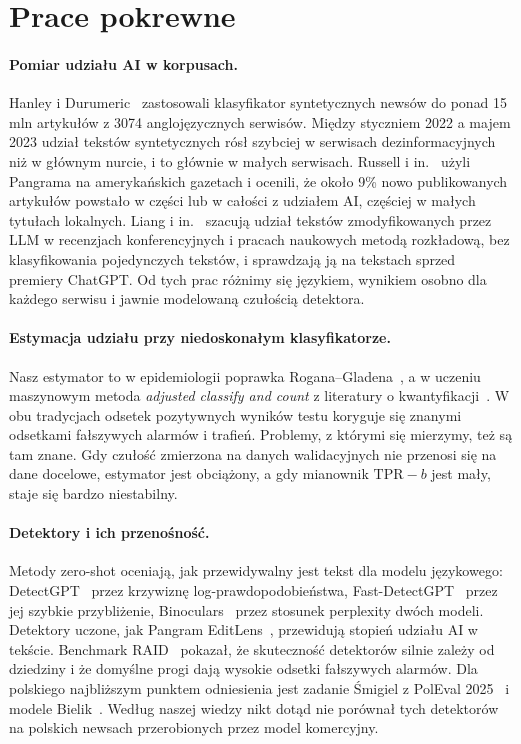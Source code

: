 \documentclass[11pt,a4paper]{article}
\begin{document}
\section{Prace pokrewne}\label{sec:prace}

\paragraph{Pomiar udziału AI w korpusach.} Hanley i Durumeric~\cite{hanley2024} zastosowali klasyfikator syntetycznych newsów do ponad 15 mln artykułów z 3074 anglojęzycznych serwisów. Między styczniem 2022 a majem 2023 udział tekstów syntetycznych rósł szybciej w serwisach dezinformacyjnych niż w głównym nurcie, i to głównie w małych serwisach. Russell i in.~\cite{russell2025} użyli Pangrama na amerykańskich gazetach i ocenili, że około 9\% nowo publikowanych artykułów powstało w części lub w całości z udziałem AI, częściej w małych tytułach lokalnych. Liang i in.~\cite{liang2024icml, liang2025} szacują udział tekstów zmodyfikowanych przez LLM w recenzjach konferencyjnych i pracach naukowych metodą rozkładową, bez klasyfikowania pojedynczych tekstów, i sprawdzają ją na tekstach sprzed premiery ChatGPT. Od tych prac różnimy się językiem, wynikiem osobno dla każdego serwisu i jawnie modelowaną czułością detektora.

\paragraph{Estymacja udziału przy niedoskonałym klasyfikatorze.} Nasz estymator to w epidemiologii poprawka Rogana--Gladena~\cite{rogan}, a w uczeniu maszynowym metoda \emph{adjusted classify and count} z literatury o kwantyfikacji~\cite{forman2008, gonzalez2017}. W obu tradycjach odsetek pozytywnych wyników testu koryguje się znanymi odsetkami fałszywych alarmów i trafień. Problemy, z którymi się mierzymy, też są tam znane. Gdy czułość zmierzona na danych walidacyjnych nie przenosi się na dane docelowe, estymator jest obciążony, a gdy mianownik $\mathrm{TPR}-b$ jest mały, staje się bardzo niestabilny.

\paragraph{Detektory i ich przenośność.} Metody zero-shot oceniają, jak przewidywalny jest tekst dla modelu językowego: DetectGPT~\cite{detectgpt} przez krzywiznę log-prawdopodobieństwa, Fast-DetectGPT~\cite{fastdetectgpt} przez jej szybkie przybliżenie, Binoculars~\cite{binoculars} przez stosunek perplexity dwóch modeli. Detektory uczone, jak Pangram EditLens~\cite{editlens}, przewidują stopień udziału AI w tekście. Benchmark RAID~\cite{raid} pokazał, że skuteczność detektorów silnie zależy od dziedziny i że domyślne progi dają wysokie odsetki fałszywych alarmów. Dla polskiego najbliższym punktem odniesienia jest zadanie Śmigiel z PolEval 2025~\cite{smigiel} i modele Bielik~\cite{bielik}. Według naszej wiedzy nikt dotąd nie porównał tych detektorów na polskich newsach przerobionych przez model komercyjny.
\end{document}
